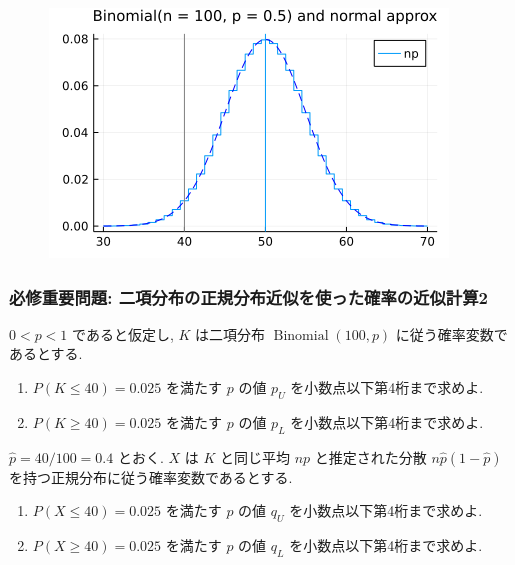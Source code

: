 \documentclass[
  letterpaper,
  DIV=11,
  numbers=noendperiod]{scrartcl}
\begin{document}
\begin{figure}[H]

{\centering \includegraphics{05 Central limit theorem_files/figure-pdf/cell-34-output-1.png}

}

\end{figure}

\hypertarget{ux5fc5ux4feeux91cdux8981ux554fux984c-ux4e8cux9805ux5206ux5e03ux306eux6b63ux898fux5206ux5e03ux8fd1ux4f3cux3092ux4f7fux3063ux305fux78baux7387ux306eux8fd1ux4f3cux8a08ux7b972}{%
\subsubsection{必修重要問題:
二項分布の正規分布近似を使った確率の近似計算2}\label{ux5fc5ux4feeux91cdux8981ux554fux984c-ux4e8cux9805ux5206ux5e03ux306eux6b63ux898fux5206ux5e03ux8fd1ux4f3cux3092ux4f7fux3063ux305fux78baux7387ux306eux8fd1ux4f3cux8a08ux7b972}}

\(0 < p < 1\) であると仮定し, \(K\) は二項分布
\(\operatorname{Binomial}(100, p)\) に従う確率変数であるとする.

\begin{enumerate}
\def\labelenumi{(\arabic{enumi})}
\item
  \(P(K \le 40) = 0.025\) を満たす \(p\) の値 \(p_U\)
  を小数点以下第4桁まで求めよ.
\item
  \(P(K \ge 40) = 0.025\) を満たす \(p\) の値 \(p_L\)
  を小数点以下第4桁まで求めよ.
\end{enumerate}

\(\hat{p}=40/100=0.4\) とおく. \(X\) は \(K\) と同じ平均 \(np\)
と推定された分散 \(n\hat{p}(1-\hat{p})\)
を持つ正規分布に従う確率変数であるとする.

\begin{enumerate}
\def\labelenumi{(\arabic{enumi})}
\setcounter{enumi}{2}
\item
  \(P(X \le 40) = 0.025\) を満たす \(p\) の値 \(q_U\)
  を小数点以下第4桁まで求めよ.
\item
  \(P(X \ge 40) = 0.025\) を満たす \(p\) の値 \(q_L\)
  を小数点以下第4桁まで求めよ.
\end{enumerate}
\end{document}
